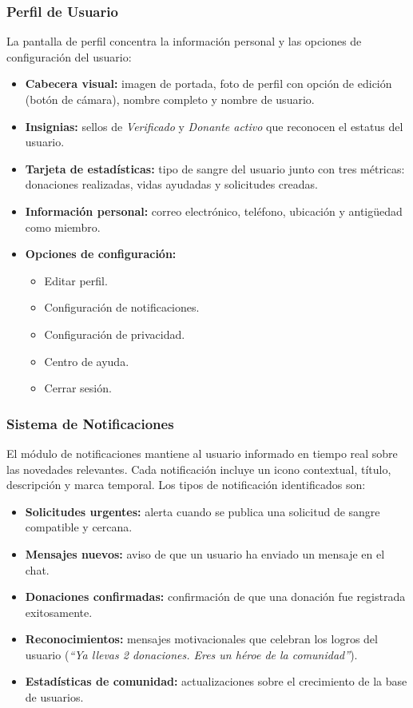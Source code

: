 \documentclass[12pt, a4paper]{article}
\begin{document}
\subsubsection{Perfil de Usuario}

La pantalla de perfil concentra la información personal y las opciones de configuración del usuario:

\begin{itemize}
    \item \textbf{Cabecera visual:} imagen de portada, foto de perfil con opción de edición (botón de cámara), nombre completo y nombre de usuario.
    \item \textbf{Insignias:} sellos de \textit{Verificado} y \textit{Donante activo} que reconocen el estatus del usuario.
    \item \textbf{Tarjeta de estadísticas:} tipo de sangre del usuario junto con tres métricas: donaciones realizadas, vidas ayudadas y solicitudes creadas.
    \item \textbf{Información personal:} correo electrónico, teléfono, ubicación y antigüedad como miembro.
    \item \textbf{Opciones de configuración:}
    \begin{itemize}
        \item Editar perfil.
        \item Configuración de notificaciones.
        \item Configuración de privacidad.
        \item Centro de ayuda.
        \item Cerrar sesión.
    \end{itemize}
\end{itemize}

\subsubsection{Sistema de Notificaciones}

El módulo de notificaciones mantiene al usuario informado en tiempo real sobre las novedades relevantes. Cada notificación incluye un icono contextual, título, descripción y marca temporal. Los tipos de notificación identificados son:

\begin{itemize}
    \item \textbf{Solicitudes urgentes:} alerta cuando se publica una solicitud de sangre compatible y cercana.
    \item \textbf{Mensajes nuevos:} aviso de que un usuario ha enviado un mensaje en el chat.
    \item \textbf{Donaciones confirmadas:} confirmación de que una donación fue registrada exitosamente.
    \item \textbf{Reconocimientos:} mensajes motivacionales que celebran los logros del usuario (\textit{``Ya llevas 2 donaciones. Eres un héroe de la comunidad''}).
    \item \textbf{Estadísticas de comunidad:} actualizaciones sobre el crecimiento de la base de usuarios.
\end{itemize}
\end{document}
